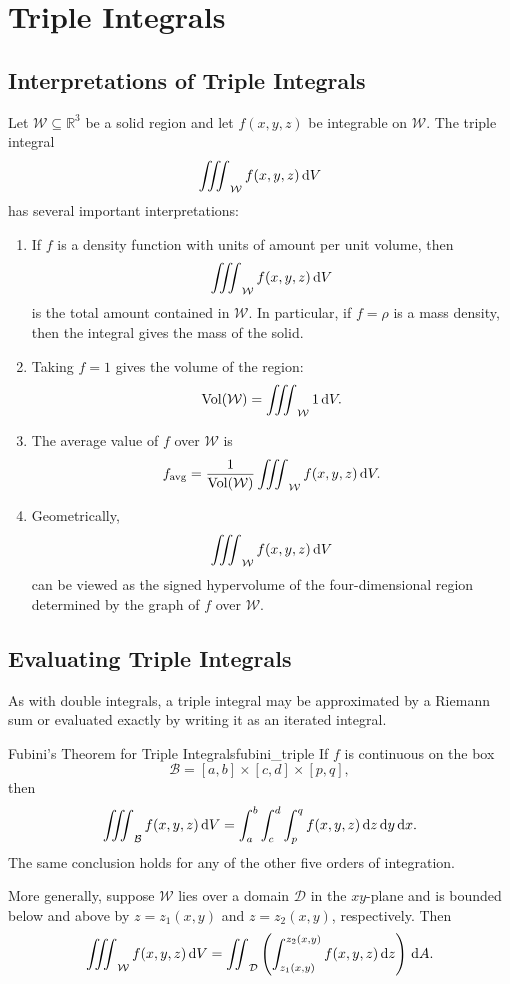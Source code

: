 \section{Triple Integrals}

\subsection{Interpretations of Triple Integrals}

Let $\mathcal{W} \subseteq \mathbb{R}^3$ be a solid region and let $f(x,y,z)$ be integrable on $\mathcal{W}$. The triple integral
\[
    \mathop{\int\mkern-10mu\int\mkern-10mu\int}\nolimits_{\mathcal{W}} f(x,y,z) \, \mathrm{d}V
\]
has several important interpretations:
\begin{enumerate}
    \item If $f$ is a density function with units of amount per unit volume, then
    \[
        \mathop{\int\mkern-10mu\int\mkern-10mu\int}\nolimits_{\mathcal{W}} f(x,y,z) \, \mathrm{d}V
    \]
    is the total amount contained in $\mathcal{W}$. In particular, if $f = \rho$ is a mass density, then the integral gives the mass of the solid.

    \item Taking $f = 1$ gives the volume of the region:
    \[
        \operatorname{Vol}(\mathcal{W}) = \mathop{\int\mkern-10mu\int\mkern-10mu\int}\nolimits_{\mathcal{W}} 1 \, \mathrm{d}V.
    \]

    \item The average value of $f$ over $\mathcal{W}$ is
    \[
        f_{\mathrm{avg}}
        = \frac{1}{\operatorname{Vol}(\mathcal{W})}
        \mathop{\int\mkern-10mu\int\mkern-10mu\int}\nolimits_{\mathcal{W}} f(x,y,z) \, \mathrm{d}V.
    \]

    \item Geometrically,
    \[
        \mathop{\int\mkern-10mu\int\mkern-10mu\int}\nolimits_{\mathcal{W}} f(x,y,z) \, \mathrm{d}V
    \]
    can be viewed as the signed hypervolume of the four-dimensional region determined by the graph of $f$ over $\mathcal{W}$.
\end{enumerate}

\subsection{Evaluating Triple Integrals}

As with double integrals, a triple integral may be approximated by a Riemann sum or evaluated exactly by writing it as an iterated integral.

\begin{theorem}{Fubini's Theorem for Triple Integrals}{fubini_triple}
If $f$ is continuous on the box
\[
    \mathcal{B} = [a,b] \times [c,d] \times [p,q],
\]
then
\[
    \mathop{\int\mkern-10mu\int\mkern-10mu\int}\nolimits_{\mathcal{B}} f(x,y,z) \, \mathrm{d}V
    = \int_a^b\int_c^d\int_p^q f(x,y,z)\,\mathrm{d}z\,\mathrm{d}y\,\mathrm{d}x.
\]
The same conclusion holds for any of the other five orders of integration.

More generally, suppose $\mathcal{W}$ lies over a domain $\mathcal{D}$ in the $xy$-plane and is bounded below and above by $z = z_1(x,y)$ and $z = z_2(x,y)$, respectively. Then
\[
    \mathop{\int\mkern-10mu\int\mkern-10mu\int}\nolimits_{\mathcal{W}} f(x,y,z) \, \mathrm{d}V
    = \mathop{\int\mkern-10mu\int}\nolimits_{\mathcal{D}} \left(\int_{z_1(x,y)}^{z_2(x,y)}
    f(x,y,z)\,\mathrm{d}z\right) \, \mathrm{d}A.
\]
\end{theorem}

